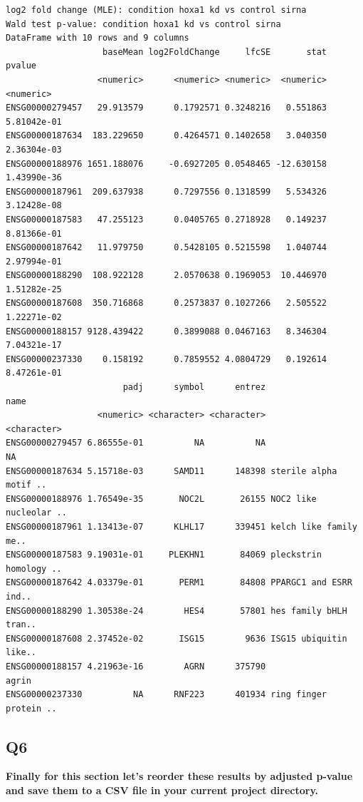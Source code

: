 \documentclass[
  letterpaper,
  DIV=11,
  numbers=noendperiod]{scrartcl}
\newenvironment{Shaded}{\begin{snugshade}}{\end{snugshade}}
\newcommand{\AttributeTok}[1]{\textcolor[rgb]{0.40,0.45,0.13}{#1}}
\newcommand{\FunctionTok}[1]{\textcolor[rgb]{0.28,0.35,0.67}{#1}}
\newcommand{\NormalTok}[1]{\textcolor[rgb]{0.00,0.23,0.31}{#1}}
\newcommand{\OtherTok}[1]{\textcolor[rgb]{0.00,0.23,0.31}{#1}}
\newcommand{\SpecialCharTok}[1]{\textcolor[rgb]{0.37,0.37,0.37}{#1}}
\newcommand{\StringTok}[1]{\textcolor[rgb]{0.13,0.47,0.30}{#1}}
\begin{document}
\begin{verbatim}
log2 fold change (MLE): condition hoxa1 kd vs control sirna 
Wald test p-value: condition hoxa1 kd vs control sirna 
DataFrame with 10 rows and 9 columns
                   baseMean log2FoldChange     lfcSE       stat      pvalue
                  <numeric>      <numeric> <numeric>  <numeric>   <numeric>
ENSG00000279457   29.913579      0.1792571 0.3248216   0.551863 5.81042e-01
ENSG00000187634  183.229650      0.4264571 0.1402658   3.040350 2.36304e-03
ENSG00000188976 1651.188076     -0.6927205 0.0548465 -12.630158 1.43990e-36
ENSG00000187961  209.637938      0.7297556 0.1318599   5.534326 3.12428e-08
ENSG00000187583   47.255123      0.0405765 0.2718928   0.149237 8.81366e-01
ENSG00000187642   11.979750      0.5428105 0.5215598   1.040744 2.97994e-01
ENSG00000188290  108.922128      2.0570638 0.1969053  10.446970 1.51282e-25
ENSG00000187608  350.716868      0.2573837 0.1027266   2.505522 1.22271e-02
ENSG00000188157 9128.439422      0.3899088 0.0467163   8.346304 7.04321e-17
ENSG00000237330    0.158192      0.7859552 4.0804729   0.192614 8.47261e-01
                       padj      symbol      entrez                   name
                  <numeric> <character> <character>            <character>
ENSG00000279457 6.86555e-01          NA          NA                     NA
ENSG00000187634 5.15718e-03      SAMD11      148398 sterile alpha motif ..
ENSG00000188976 1.76549e-35       NOC2L       26155 NOC2 like nucleolar ..
ENSG00000187961 1.13413e-07      KLHL17      339451 kelch like family me..
ENSG00000187583 9.19031e-01     PLEKHN1       84069 pleckstrin homology ..
ENSG00000187642 4.03379e-01       PERM1       84808 PPARGC1 and ESRR ind..
ENSG00000188290 1.30538e-24        HES4       57801 hes family bHLH tran..
ENSG00000187608 2.37452e-02       ISG15        9636 ISG15 ubiquitin like..
ENSG00000188157 4.21963e-16        AGRN      375790                  agrin
ENSG00000237330          NA      RNF223      401934 ring finger protein ..
\end{verbatim}

\hypertarget{q6}{%
\subsection{\texorpdfstring{\textbf{Q6}}{Q6}}\label{q6}}

\textbf{Finally for this section let's reorder these results by adjusted
p-value and save them to a CSV file in your current project directory.}

\begin{Shaded}
\end{Shaded}
\end{document}
